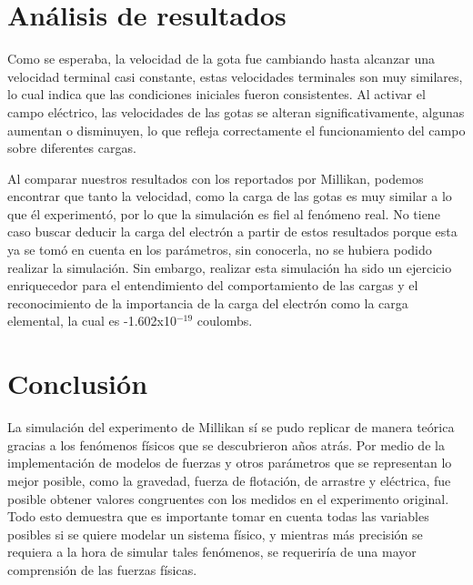 \documentclass[
 reprint,
 amsmath,amssymb,
 aps,
]{revtex4-2}
\begin{document}
\section{An\'alisis de resultados}

Como se esperaba, la velocidad de la gota fue cambiando hasta alcanzar una velocidad terminal casi constante, estas velocidades terminales son muy similares, lo cual indica que las condiciones iniciales fueron consistentes. Al activar el campo eléctrico, las velocidades de las gotas se alteran significativamente, algunas aumentan o disminuyen, lo que refleja correctamente el funcionamiento del campo sobre diferentes cargas. 

Al comparar nuestros resultados con los reportados por Millikan, podemos encontrar que tanto la velocidad, como la carga de las gotas es muy similar a lo que él experimentó, por lo que la simulación es fiel al fenómeno real. No tiene caso buscar deducir la carga del electrón a partir de estos resultados porque esta ya se tomó en cuenta en los parámetros, sin conocerla, no se hubiera podido realizar la simulación. Sin embargo, realizar esta simulación ha sido un ejercicio enriquecedor para el entendimiento del comportamiento de las cargas y el reconocimiento de la importancia de la carga del electrón como la carga elemental, la cual es -1.602x10$^{-19}$ coulombs.

\section{Conclusi\'on}
La simulación del experimento de Millikan sí se pudo replicar de manera teórica gracias a los fenómenos físicos que se descubrieron años atrás. Por medio de la implementación de modelos de fuerzas y otros parámetros que se representan lo mejor posible, como la gravedad, fuerza de flotación, de arrastre y eléctrica, fue posible obtener valores congruentes con los medidos en el experimento original. Todo esto demuestra que es importante tomar en cuenta todas las variables posibles si se quiere modelar un sistema físico, y mientras más precisión se requiera a la hora de simular tales fenómenos, se requeriría de una mayor comprensión de las fuerzas físicas.

\nocite{*}

\end{document}
